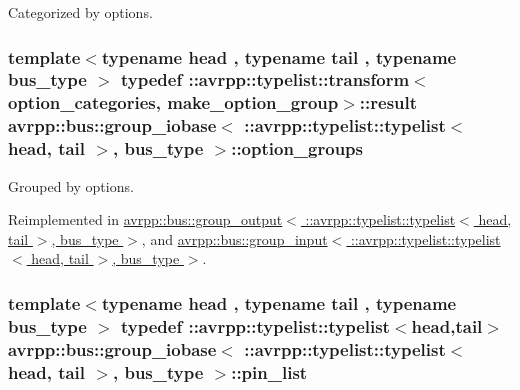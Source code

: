 Categorized by options. 

\hypertarget{structavrpp_1_1bus_1_1group__iobase_3_01_1_1avrpp_1_1typelist_1_1typelist_3_01head_00_01tail_01_4_00_01bus__type_01_4_ac3e03bebeadefc2d2c4ad6a0b6b49899}{
\subsubsection[{option\_\-groups}]{\setlength{\rightskip}{0pt plus 5cm}template$<$typename head , typename tail , typename bus\_\-type $>$ typedef ::avrpp::typelist::transform$<${\bf option\_\-categories}, make\_\-option\_\-group$>$::result avrpp::bus::group\_\-iobase$<$ ::{\bf avrpp::typelist::typelist}$<$ head, tail $>$, bus\_\-type $>$::{\bf option\_\-groups}}}
\label{structavrpp_1_1bus_1_1group__iobase_3_01_1_1avrpp_1_1typelist_1_1typelist_3_01head_00_01tail_01_4_00_01bus__type_01_4_ac3e03bebeadefc2d2c4ad6a0b6b49899}


Grouped by options. 



Reimplemented in \hyperlink{structavrpp_1_1bus_1_1group__output_3_01_1_1avrpp_1_1typelist_1_1typelist_3_01head_00_01tail_01_4_00_01bus__type_01_4_acde54fbde4fa72d86cdd16a22955be53}{avrpp::bus::group\_\-output$<$ ::avrpp::typelist::typelist$<$ head, tail $>$, bus\_\-type $>$}, and \hyperlink{structavrpp_1_1bus_1_1group__input_3_01_1_1avrpp_1_1typelist_1_1typelist_3_01head_00_01tail_01_4_00_01bus__type_01_4_a839b778c3b94a101da470fa0563ee178}{avrpp::bus::group\_\-input$<$ ::avrpp::typelist::typelist$<$ head, tail $>$, bus\_\-type $>$}.

\hypertarget{structavrpp_1_1bus_1_1group__iobase_3_01_1_1avrpp_1_1typelist_1_1typelist_3_01head_00_01tail_01_4_00_01bus__type_01_4_ac281364e1172dc238c204e44d0303397}{
\subsubsection[{pin\_\-list}]{\setlength{\rightskip}{0pt plus 5cm}template$<$typename head , typename tail , typename bus\_\-type $>$ typedef ::{\bf avrpp::typelist::typelist}$<$head,tail$>$ avrpp::bus::group\_\-iobase$<$ ::{\bf avrpp::typelist::typelist}$<$ head, tail $>$, bus\_\-type $>$::{\bf pin\_\-list}}}
\label{structavrpp_1_1bus_1_1group__iobase_3_01_1_1avrpp_1_1typelist_1_1typelist_3_01head_00_01tail_01_4_00_01bus__type_01_4_ac281364e1172dc238c204e44d0303397}


